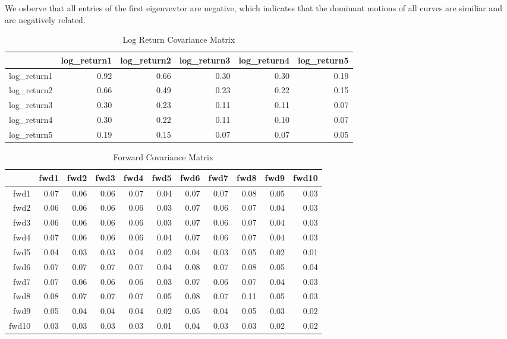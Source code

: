 \documentclass{article}
\begin{document}
\begin{enumerate}
    We osberve that all entries of the first eigenvevtor are negative, which indicates that the dominant motions of all curves are similiar and are negatively related.
    \begin{table}[ht]
    \centering
    \begin{tabular}{rrrrrr}
    \hline 
 & log\_return1 & log\_return2 & log\_return3 & log\_return4 & log\_return5 \\ 
    \hline
log\_return1 & 0.92 & 0.66 & 0.30 & 0.30 & 0.19 \\ 
  log\_return2 & 0.66 & 0.49 & 0.23 & 0.22 & 0.15 \\ 
  log\_return3 & 0.30 & 0.23 & 0.11 & 0.11 & 0.07 \\ 
  log\_return4 & 0.30 & 0.22 & 0.11 & 0.10 & 0.07 \\ 
  log\_return5 & 0.19 & 0.15 & 0.07 & 0.07 & 0.05 \\ 
   \hline
    \end{tabular}
    \caption{Log Return Covariance Matrix}
    \label{5}
    \end{table}

    \begin{table}[ht]
    \centering
    \begin{tabular}{rrrrrrrrrrr}
    \hline
& fwd1 & fwd2 & fwd3 & fwd4 & fwd5 & fwd6 & fwd7 & fwd8 & fwd9 & fwd10 \\ 
    \hline
fwd1 & 0.07 & 0.06 & 0.06 & 0.07 & 0.04 & 0.07 & 0.07 & 0.08 & 0.05 & 0.03 \\ 
  fwd2 & 0.06 & 0.06 & 0.06 & 0.06 & 0.03 & 0.07 & 0.06 & 0.07 & 0.04 & 0.03 \\ 
  fwd3 & 0.06 & 0.06 & 0.06 & 0.06 & 0.03 & 0.07 & 0.06 & 0.07 & 0.04 & 0.03 \\ 
  fwd4 & 0.07 & 0.06 & 0.06 & 0.06 & 0.04 & 0.07 & 0.06 & 0.07 & 0.04 & 0.03 \\ 
  fwd5 & 0.04 & 0.03 & 0.03 & 0.04 & 0.02 & 0.04 & 0.03 & 0.05 & 0.02 & 0.01 \\ 
  fwd6 & 0.07 & 0.07 & 0.07 & 0.07 & 0.04 & 0.08 & 0.07 & 0.08 & 0.05 & 0.04 \\ 
  fwd7 & 0.07 & 0.06 & 0.06 & 0.06 & 0.03 & 0.07 & 0.06 & 0.07 & 0.04 & 0.03 \\ 
  fwd8 & 0.08 & 0.07 & 0.07 & 0.07 & 0.05 & 0.08 & 0.07 & 0.11 & 0.05 & 0.03 \\ 
  fwd9 & 0.05 & 0.04 & 0.04 & 0.04 & 0.02 & 0.05 & 0.04 & 0.05 & 0.03 & 0.02 \\ 
  fwd10 & 0.03 & 0.03 & 0.03 & 0.03 & 0.01 & 0.04 & 0.03 & 0.03 & 0.02 & 0.02 \\ 
   \hline
\end{tabular}
\caption{Forward Covariance Matrix}
\end{table}
\label{6}


\end{enumerate}
\end{document}
